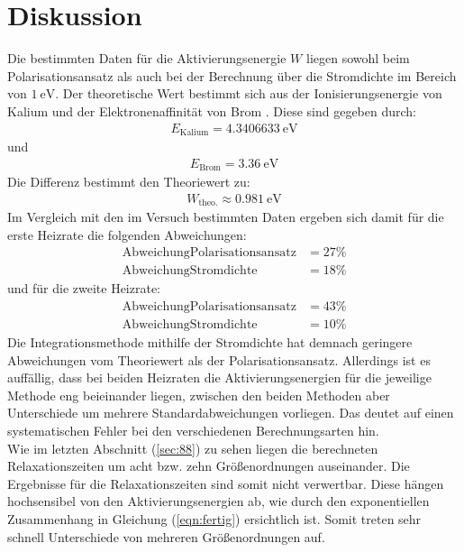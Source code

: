 \section{Diskussion}
\label{sec:Diskussion}
Die bestimmten Daten für die Aktivierungsenergie $W$ liegen sowohl beim Polarisationsansatz als auch bei der Berechnung über die Stromdichte im Bereich von $\SI{1}{\electronvolt}$. Der theoretische Wert bestimmt sich
aus der Ionisierungsenergie von Kalium \cite{Anleitung6} und der Elektronenaffinität von Brom \cite{Anleitung5}. Diese sind gegeben durch:
\begin{align*}
  E_\mathrm{Kalium}=\SI{4.3406633}{\electronvolt}
\end{align*}
und
\begin{align*}
  E_\mathrm{Brom}=\SI{3.36}{\electronvolt}
\end{align*}
Die Differenz bestimmt den Theoriewert \cite[4]{Anleitung8} zu:
\begin{align*}
  W_\mathrm{theo.}\approx\SI{0.981}{\electronvolt}
\end{align*}
Im Vergleich mit den im Versuch bestimmten Daten ergeben sich damit für die erste Heizrate die folgenden Abweichungen:
\begin{align*}
 \mathrm{Abweichung Polarisationsansatz}&=27\% \\
 \mathrm{Abweichung Stromdichte}&=18\%
\end{align*}
und für die zweite Heizrate:
\begin{align*}
 \mathrm{Abweichung Polarisationsansatz}&=43\% \\
 \mathrm{Abweichung Stromdichte}&=10\%
\end{align*}
Die Integrationsmethode mithilfe der Stromdichte hat demnach geringere Abweichungen vom Theoriewert als der Polarisationsansatz.
Allerdings ist es auffällig, dass bei
beiden Heizraten die Aktivierungsenergien für die jeweilige Methode eng beieinander liegen, zwischen den beiden Methoden aber Unterschiede um mehrere Standardabweichungen vorliegen. Das deutet auf einen systematischen Fehler bei den verschiedenen Berechnungsarten hin.\\
Wie im letzten Abschnitt (\ref{sec:88}) zu sehen liegen die berechneten Relaxationszeiten um acht bzw. zehn Größenordnungen auseinander. Die Ergebnisse für die Relaxationszeiten sind somit nicht verwertbar. Diese hängen hochsensibel von den Aktivierungsenergien ab, wie durch den exponentiellen Zusammenhang in Gleichung (\ref{eqn:fertig}) ersichtlich ist. Somit treten sehr schnell Unterschiede von mehreren Größenordnungen auf.

